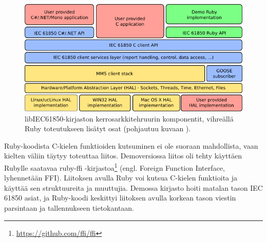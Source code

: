 \begin{figure}
	\includegraphics[width=1\textwidth]{pictures/libiec61850-layer-architecture.png}
	\caption{libIEC61850-kirjaston kerrosarkkitehruurin komponentit, vihreällä Ruby toteutukseen lisätyt osat (pohjautuu kuvaan \cite{libIEC61850-api-overview}).}
	\label{fig:libiec61850-layer-architecture}
\end{figure}

Ruby-koodista C-kielen funktioiden kutsuminen ei ole suoraan mahdollista, vaan kielten väliin täytyy toteuttaa liitos. Demoversiossa liitos oli tehty käyttäen Rubylle saatavaa ruby-ffi -kirjastoa\footnote{\url{https://github.com/ffi/ffi}} (engl. Foreign Function Interface, lyhennetään FFI). Liitoksen avulla Ruby voi kutsua C-kielen funktioita ja käyttää sen struktuureita ja muuttujia. Demossa kirjasto hoiti matalan tason IEC 61850 asiat, ja Ruby-koodi keskittyi liitoksen avulla korkean tason viestin parsintaan ja tallennukseen tietokantaan.


